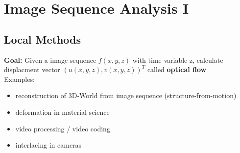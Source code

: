 \documentclass[11pt]{article}
\begin{document}
\section{Image Sequence Analysis I}
\label{sec-3}
\subsection{Local Methods}
\label{sec-3-1}
\textbf{Goal:} Given a image sequence $f(x,y,z)$ with time variable z, calculate displacment
vector $(u(x,y,z),v(x,y,z))^T$ called \textbf{optical flow}\\
   Examples:
\begin{itemize}
\item reconstruction of 3D-World from image sequence (structure-from-motion)
\item deformation in material science
\item video processing / video coding
\item interlacing in cameras
\end{itemize}
\end{document}
